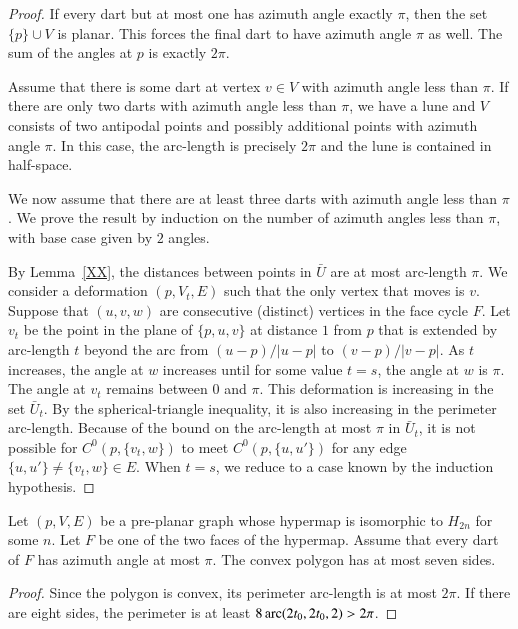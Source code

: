 \begin{proof}  If every dart but at most one 
has azimuth angle exactly $\pi$, then the set $\{p\}\cup V$ is
planar.  This forces the final dart to have azimuth angle $\pi$ as well. 
The sum of the angles at $p$ is exactly $2\pi$.

Assume that there is some dart at vertex $v\in V$ with azimuth angle less than $\pi$.
If there are only two darts with azimuth angle less than $\pi$, 
we have
a lune and $V$ consists of two antipodal points and possibly additional points
with azimuth angle $\pi$.  In this case, the arc-length
is precisely $2\pi$ and the lune is contained in half-space.

We now assume that there are at least three darts with azimuth angle less than $\pi$.
We prove the result by induction on the number of azimuth angles less than $\pi$,
with base case given by $2$ angles.

By Lemma~\ref{XX}, the distances between points in $\bar U$ are at most arc-length $\pi$.
We consider a deformation $(p,V_t,E)$ such that the only vertex that moves is
$v$.  Suppose that $(u,v,w)$ are consecutive (distinct) vertices in the face cycle $F$.
Let $v_t$ be the point in the plane of $\{p,u,v\}$ at distance $1$ from $p$ that
is extended by arc-length $t$ beyond the arc from $(u-p)/|u-p|$ to $(v-p)/|v-p|$.
As $t$ increases, the angle at $w$ increases until for some value $t=s$, the angle
at $w$ is $\pi$.  The angle at $v_t$ remains between $0$ and $\pi$.  This deformation
is increasing in the set $\bar U_t$.  By the spherical-triangle inequality, it is
also increasing in the perimeter arc-length.   Because of the bound on the arc-length
at most $\pi$ in $\bar U_t$, it is not possible for $C^0(p,\{v_t,w\})$ to meet
$C^0(p,\{u,u'\})$ for any edge $\{u,u'\}\ne\{v_t,w\}\in E$.   
When $t=s$, we reduce to a case known by the induction hypothesis.
\end{proof}





\begin{lemma}
    \label{lemma:7-sides}
Let $(p,V,E)$ be a pre-planar graph whose hypermap is isomorphic
to $H_{2n}$ for some $n$.  Let $F$ be one of the two faces of the
hypermap.  Assume that every dart of $F$ has azimuth angle at
most $\pi$.  
The convex polygon has at most seven sides.
\end{lemma}

\begin{proof}
Since the polygon is convex, its perimeter arc-length is at
most $2\pi$.  If there are eight sides, the perimeter
is at least $8\operatorname{arc}(2t_0,2t_0,2)>2\pi$.
\end{proof}




